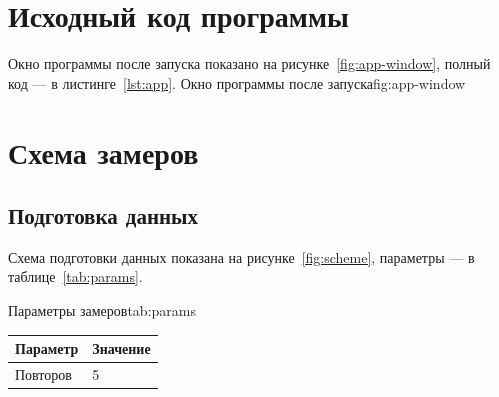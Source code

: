 \documentclass{mtuci-report}
\begin{document}
\appendix
\section{Исходный код программы}\label{app:code}
Окно программы после запуска показано на рисунке~\ref{fig:app-window}, полный код —
в листинге~\ref{lst:app}.
%
  {Окно программы после запуска}{fig:app-window}

\section{Схема замеров}\label{app:scheme}
\subsection{Подготовка данных}
Схема подготовки данных показана на рисунке~\ref{fig:scheme}, параметры — в
таблице~\ref{tab:params}.
\begin{bbttable}{Параметры замеров}{tab:params}
  \begin{tabular}{|l|l|}
    \hline
    Параметр & Значение \\ \hline
    Повторов & 5 \\ \hline
  \end{tabular}
\end{bbttable}
\end{document}
